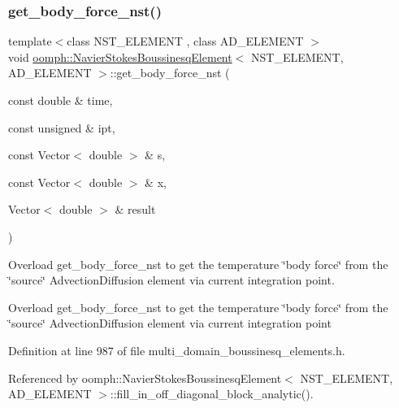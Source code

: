 \subsubsection{\texorpdfstring{get\+\_\+body\+\_\+force\+\_\+nst()}{get\_body\_force\_nst()}}
{\footnotesize\ttfamily template$<$class N\+S\+T\+\_\+\+E\+L\+E\+M\+E\+NT , class A\+D\+\_\+\+E\+L\+E\+M\+E\+NT $>$ \\
void \hyperlink{classoomph_1_1NavierStokesBoussinesqElement}{oomph\+::\+Navier\+Stokes\+Boussinesq\+Element}$<$ N\+S\+T\+\_\+\+E\+L\+E\+M\+E\+NT, A\+D\+\_\+\+E\+L\+E\+M\+E\+NT $>$\+::get\+\_\+body\+\_\+force\+\_\+nst (\begin{DoxyParamCaption}\item[{const double \&}]{time,  }\item[{const unsigned \&}]{ipt,  }\item[{const Vector$<$ double $>$ \&}]{s,  }\item[{const Vector$<$ double $>$ \&}]{x,  }\item[{Vector$<$ double $>$ \&}]{result }\end{DoxyParamCaption})}



Overload get\+\_\+body\+\_\+force\+\_\+nst to get the temperature \char`\"{}body force\char`\"{} from the \char`\"{}source\char`\"{} Advection\+Diffusion element via current integration point. 

Overload get\+\_\+body\+\_\+force\+\_\+nst to get the temperature \char`\"{}body force\char`\"{} from the \char`\"{}source\char`\"{} Advection\+Diffusion element via current integration point 

Definition at line 987 of file multi\+\_\+domain\+\_\+boussinesq\+\_\+elements.\+h.



Referenced by oomph\+::\+Navier\+Stokes\+Boussinesq\+Element$<$ N\+S\+T\+\_\+\+E\+L\+E\+M\+E\+N\+T, A\+D\+\_\+\+E\+L\+E\+M\+E\+N\+T $>$\+::fill\+\_\+in\+\_\+off\+\_\+diagonal\+\_\+block\+\_\+analytic().

\mbox{\label{classoomph_1_1NavierStokesBoussinesqElement_a8a84c39e2156ab16b7aefc400891ac27}} 
